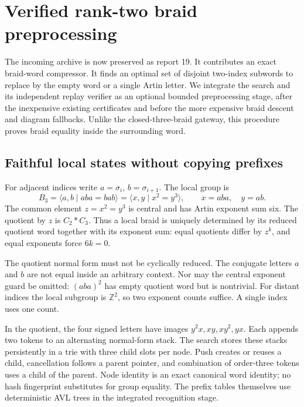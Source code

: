 \section{Verified rank-two braid preprocessing}
\label{sec:ranktwo-integration}

The incoming archive 
is now preserved as report 19. It contributes an exact braid-word compressor. It finds an optimal set of
disjoint two-index subwords to replace by the empty word or a single
Artin letter. We integrate the search and its independent replay verifier
as an optional bounded preprocessing stage, after the inexpensive existing
certificates and before the more expensive braid descent and diagram
fallbacks. Unlike the closed-three-braid gateway, this procedure proves
braid equality inside the surrounding word.

\subsection{Faithful local states without copying prefixes}
For adjacent indices write $a=\sigma_i$, $b=\sigma_{i+1}$.
The local group is
\[
 B_3=\langle a,b\mid aba=bab\rangle
     =\langle x,y\mid x^2=y^3\rangle,
 \qquad x=aba,\quad y=ab.
\]
The common element $z=x^2=y^3$ is central and has Artin exponent sum six.
The quotient by $z$ is $C_2*C_3$. Thus a local braid is uniquely determined
by its reduced quotient word together with its exponent sum: equal
quotients differ by $z^k$, and equal exponents force $6k=0$.

The quotient normal form must not be cyclically reduced. The conjugate
letters $a$ and $b$ are not equal inside an arbitrary context. Nor may the
central exponent guard be omitted: $(aba)^2$ has empty quotient word but
is nontrivial. For distant indices the local subgroup is $\mathbb Z^2$,
so two exponent counts suffice. A single index uses one count.

In the quotient, the four signed letters have images
$y^2x,xy,xy^2,yx$. Each appends two tokens to an alternating normal-form
stack. The search stores these stacks persistently in a trie with three
child slots per node. Push creates or reuses a child, cancellation follows
a parent pointer, and combination of order-three tokens uses a child of
the parent. Node identity is an exact canonical word identity; no hash
fingerprint substitutes for group equality. The prefix tables themselves
use deterministic AVL trees in the integrated recognition stage.

